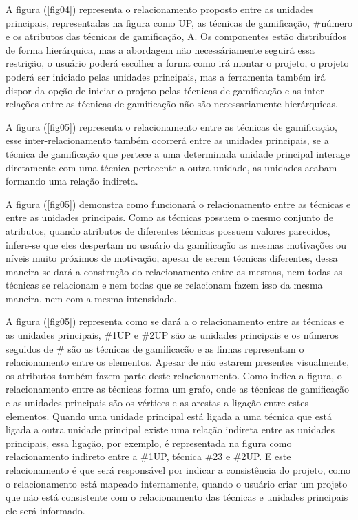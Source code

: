 \newpage

A figura (\ref{fig04}) representa o relacionamento proposto entre as unidades principais, representadas na figura como UP, as técnicas de gamificação, \#número e os atributos das técnicas de gamificação, A. Os componentes estão distribuídos de forma hierárquica, mas a abordagem não necessáriamente seguirá essa restrição, o usuário poderá escolher a forma como irá montar o projeto, o projeto poderá ser iniciado pelas unidades principais, mas a ferramenta também irá dispor da opção de iniciar o projeto pelas técnicas de gamificação e as inter-relações entre as técnicas de gamificação não são necessariamente hierárquicas.

A figura (\ref{fig05}) representa o relacionamento entre as técnicas de gamificação, esse inter-relacionamento também ocorrerá entre as unidades principais, se a técnica de gamificação que pertece a uma determinada unidade principal interage diretamente com uma técnica pertecente a outra unidade, as unidades acabam formando uma relação indireta. 

A figura (\ref{fig05}) demonstra como funcionará o relacionamento entre as técnicas e entre as unidades principais. Como as técnicas possuem o mesmo conjunto de atributos, quando atributos de diferentes técnicas possuem valores parecidos, infere-se que eles despertam no usuário da gamificação as mesmas motivações ou níveis muito próximos de motivação, apesar de serem técnicas diferentes, dessa maneira se dará a construção do relacionamento entre as mesmas, nem todas as técnicas se relacionam e nem todas que se relacionam fazem isso da mesma maneira, nem com a mesma intensidade.

A figura (\ref{fig05}) representa como se dará a o relacionamento entre as técnicas e as unidades principais, \#1UP e \#2UP são as unidades principais e os números seguidos de \# são as técnicas de gamificacão e as linhas representam o relacionamento entre os elementos. Apesar de não estarem presentes visualmente, os atributos também fazem parte deste relacionamento. Como indica a figura, o relacionamento entre as técnicas forma um grafo, onde as técnicas de gamificação e as unidades principais são os vértices e as arestas a ligação entre estes elementos. Quando uma unidade principal está ligada a uma técnica que está ligada a outra unidade principal existe uma relação indireta entre as unidades principais, essa ligação, por exemplo, é representada na figura como relacionamento indireto entre a \#1UP, técnica \#23 e \#2UP. E este relacionamento é que será responsável por indicar a consistência do projeto, como o relacionamento está mapeado internamente, quando o usuário criar um projeto que não está consistente com o relacionamento das técnicas e unidades principais ele será informado.

